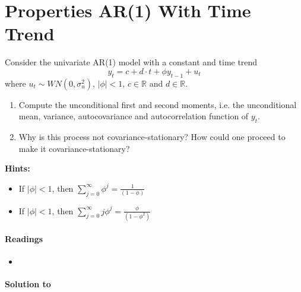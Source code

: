 \section[Properties AR(1) With Time Trend]{Properties AR(1) With Time Trend\label{ex:PropertiesAR1TimeTrend}}

Consider the univariate AR(1) model with a constant and time trend
$$ y_t = c + d\cdot t + \phi y_{t-1} + u_t$$
where $u_t \sim WN(0,\sigma_u^2)$, $|\phi|<1$, $c \in \mathbb{R}$ and $d \in \mathbb{R}$.
\begin{enumerate}
	\item Compute the unconditional first and second moments, i.e. the unconditional mean, variance, autocovariance and autocorrelation function of $y_t$.	
	\item Why is this process not covariance-stationary? How could one proceed to make it covariance-stationary?	
\end{enumerate}
\textbf{Hints:}
\begin{itemize}
	\item If $|\phi|<1$, then $\sum_{j=0}^{\infty} \phi^j = \frac{1}{(1-\phi)}$
	\item If $|\phi|<1$, then $\sum_{j=0}^{\infty} j \phi^j = \frac{\phi}{(1-\phi^2)}$
\end{itemize}

\paragraph{Readings}
\begin{itemize}
	\item \textcite{Lutkepohl_2004_UnivariateTimeSeries}
\end{itemize}

\begin{solution}\textbf{Solution to }
\ifDisplaySolutions

\fi
\newpage
\end{solution}